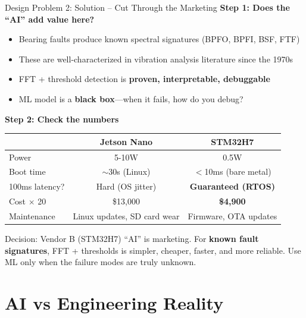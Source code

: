 \documentclass[aspectratio=169,11pt]{beamer}
\begin{document}
\begin{frame}{Design Problem 2: Solution -- Cut Through the Marketing}
    \textbf{Step 1: Does the ``AI'' add value here?}
    
    \begin{itemize}
        \item Bearing faults produce known spectral signatures (BPFO, BPFI, BSF, FTF)
        \item These are well-characterized in vibration analysis literature since the 1970s
        \item FFT + threshold detection is \textbf{proven, interpretable, debuggable}
        \item ML model is a \textbf{black box}---when it fails, how do you debug?
    \end{itemize}
    
    \vspace{0.2cm}
    \textbf{Step 2: Check the numbers}
    \begin{center}
    \begin{tabular}{lcc}
        \toprule
        & \textbf{Jetson Nano} & \textbf{STM32H7} \\
        \midrule
        Power & 5-10W & 0.5W \\
        Boot time & $\sim$30s (Linux) & $<$10ms (bare metal) \\
        100ms latency? & Hard (OS jitter) & \textbf{Guaranteed (RTOS)} \\
        Cost $\times$ 20 & \$13,000 & \textbf{\$4,900} \\
        Maintenance & Linux updates, SD card wear & Firmware, OTA updates \\
        \bottomrule
    \end{tabular}
    \end{center}
    
    \begin{alertblock}{Decision: Vendor B (STM32H7)}
        ``AI'' is marketing. For \textbf{known fault signatures}, FFT + thresholds is simpler, cheaper, faster, and more reliable. Use ML only when the failure modes are truly unknown.
    \end{alertblock}
\end{frame}

\section{AI vs Engineering Reality}
\end{document}
